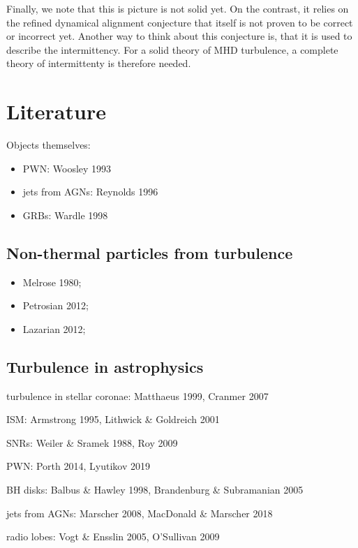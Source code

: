 \documentclass{aa}
\begin{document}
Finally, we note that this is picture is not solid yet.
On the contrast, it relies on the refined dynamical alignment conjecture that itself is not proven to be correct or incorrect yet.
Another way to think about this conjecture is, that it is used to describe the intermittency.
For a solid theory of MHD turbulence, a complete theory of intermittenty is therefore needed.




\section{Literature }\label{sect:literature}

Objects themselves:
\begin{itemize}
    \item PWN: Woosley 1993
    \item jets from AGNs: Reynolds 1996
    \item GRBs: Wardle 1998
\end{itemize}

\subsection{Non-thermal particles from turbulence}
\begin{itemize}
    \item Melrose 1980;
    \item Petrosian 2012;
    \item Lazarian 2012;
\end{itemize}

\subsection{Turbulence in astrophysics}

turbulence in stellar coronae:
Matthaeus 1999, Cranmer 2007

ISM:
Armstrong 1995, Lithwick \& Goldreich 2001

SNRs:
Weiler \& Sramek 1988, Roy 2009

PWN:
Porth 2014, Lyutikov 2019

BH disks:
Balbus \& Hawley 1998, Brandenburg \& Subramanian 2005

jets from AGNs:
Marscher 2008, MacDonald \& Marscher 2018

radio lobes:
Vogt \& Ensslin 2005, O'Sullivan 2009
\end{document}
